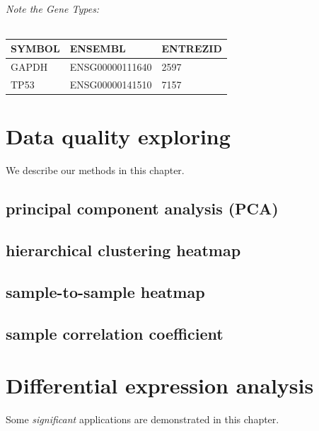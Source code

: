 \documentclass[
  a4paper,
  oneside]{book}
\begin{document}
\hypertarget{note-the-gene-types}{%
\subparagraph*{Note the Gene Types:}\label{note-the-gene-types}}

\begin{longtable}[]{@{}lll@{}}
\toprule
SYMBOL & ENSEMBL & ENTREZID\tabularnewline
\midrule
\endhead
GAPDH & ENSG00000111640 & 2597\tabularnewline
TP53 & ENSG00000141510 & 7157\tabularnewline
\bottomrule
\end{longtable}

\hypertarget{data-quality-exploring}{%
\chapter{Data quality exploring}\label{data-quality-exploring}}

We describe our methods in this chapter.

\hypertarget{principal-component-analysis-pca}{%
\section{principal component analysis (PCA)}\label{principal-component-analysis-pca}}

\hypertarget{hierarchical-clustering-heatmap}{%
\section{hierarchical clustering heatmap}\label{hierarchical-clustering-heatmap}}

\hypertarget{sample-to-sample-heatmap}{%
\section{sample-to-sample heatmap}\label{sample-to-sample-heatmap}}

\hypertarget{sample-correlation-coefficient}{%
\section{sample correlation coefficient}\label{sample-correlation-coefficient}}

\hypertarget{differential-expression-analysis}{%
\chapter{Differential expression analysis}\label{differential-expression-analysis}}

Some \emph{significant} applications are demonstrated in this chapter.
\end{document}
